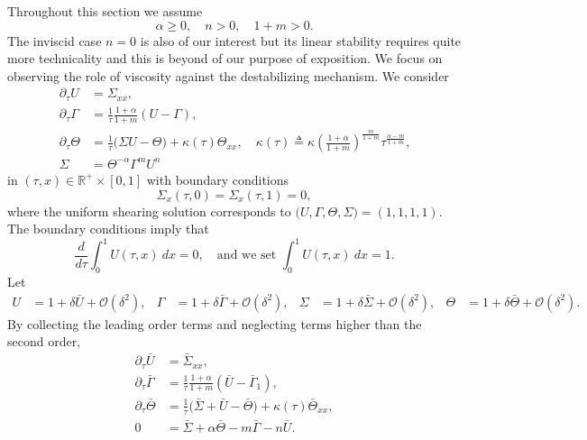 \documentclass[a4paper,11pt]{article}
\theoremstyle{remark}
\begin{document}
Throughout this section we assume
\begin{equation} \alpha\ge0, \quad n>0, \quad 1+m>0. \label{eq:range} \end{equation}
The inviscid case $n=0$ is also of our interest but its linear stability requires quite more technicality and this is beyond of our purpose of exposition. We focus on  observing the role of viscosity against the destabilizing mechanism.
We consider
\begin{equation} \label{eq:system}
 \begin{aligned}
  \partial_\tau U &= \Sigma_{xx},\\
  \partial_\tau\Gamma &= \frac{1}{\tau}\frac{1+\alpha}{1+m}(U-\Gamma),\\
  \partial_\tau\Theta &= \frac{1}{\tau}\Big(\Sigma U -\Theta\Big) + \kappa(\tau)\Theta_{xx}, \quad \text{$\kappa(\tau)\triangleq\kappa\left(\frac{1+\alpha}{1+m}\right)^{\frac{m}{1+m}}\tau^{\frac{\alpha-m}{1+m}}$,}\\
  \Sigma &= \Theta^{-\alpha}\Gamma^m U^n
 \end{aligned}
\end{equation}
in $(\tau,x)\in \mathbb{R}^+\times [0,1]$ with boundary conditions
\begin{equation}
 \Sigma_x(\tau,0)=\Sigma_x(\tau,1)=0,
\end{equation}
where the uniform shearing solution corresponds to $\big(U, \Gamma, \Theta, \Sigma\big) = (1,1,1,1)$.
The boundary conditions imply that
\begin{equation*}
 \frac{d}{d\tau}\int_0^1 U(\tau,x) \: dx = 0, \quad \text{and we set } \int_0^1 U(\tau,x) \: dx = 1.
\end{equation*}
Let
\begin{align*}
 U &= 1 + \delta \bar{U} + \mathcal{O}(\delta^2), & \Gamma &= 1 + \delta \bar\Gamma + \mathcal{O}(\delta^2), &
 \Sigma &= 1 + \delta \bar\Sigma + \mathcal{O}(\delta^2), & \Theta &= 1 + \delta \bar\Theta + \mathcal{O}(\delta^2).
\end{align*}
By collecting the leading order terms and neglecting terms higher than the  second order,
\begin{equation} \label{eq:linsystem}
 \begin{aligned}
  \partial_\tau \bar U &= \bar\Sigma_{xx},\\
  \partial_\tau \bar\Gamma &= \frac{1}{\tau}\frac{1+\alpha}{1+m}(\bar U-\bar\Gamma_1),\\
  \partial_\tau \bar\Theta &= \frac{1}{\tau}\Big(\bar\Sigma+ \bar U -\bar\Theta\Big) + \kappa(\tau)\bar\Theta_{xx},\\
  0&=\bar\Sigma + \alpha\bar\Theta -m\bar\Gamma - n\bar U .
 \end{aligned}
\end{equation}
\end{document}
